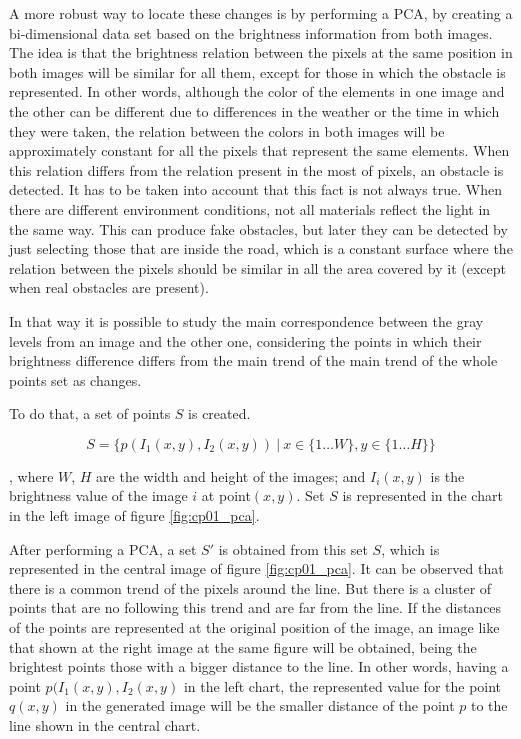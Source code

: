 A more robust way to locate these changes is by performing a \ac{PCA}, by creating a bi-dimensional data set based on the brightness information from both images. The idea is that the brightness relation between the pixels at the same position in both images will be similar for all them, except for those in which the obstacle is represented. In other words, although the color of the elements in one image and the other can be different due to differences in the weather or the time in which they were taken, the relation between the colors in both images will be approximately constant for all the pixels that represent the same elements. When this relation differs from the relation present in the most of pixels, an obstacle is detected. It has to be taken into account that this fact is not always true. When there are different environment conditions, not all materials reflect the light in the same way. This can produce fake obstacles, but later they can be detected by just selecting those that are inside the road, which is a constant surface where the relation between the pixels should be similar in all the area covered by it (except when real obstacles are present).

In that way it is possible to study the main correspondence between the gray levels from an image and the other one, considering the points in which their brightness difference differs from the main trend of the main trend of the whole points set as changes.

To do that, a set of points $S$ is created.

\begin{equation}\label{eq:cp01_brightness_relation}
S = \{ p(I_1(x, y), I_2(x,y)) ~|~ x \in \{1 \dots W\}, y \in \{1 \dots H\} \}
\end{equation}

, where $W$, $H$ are the width and height of the images; and $I_i(x, y)$ is the brightness value of the image $i$ at point$(x,y)$. Set $S$ is represented in the chart in the left image of figure \ref{fig:cp01_pca}.

After performing a PCA, a set $S'$ is obtained from this set $S$, which is represented in the central image of figure \ref{fig:cp01_pca}. It can be observed that there is a common trend of the pixels around the line. But there is a cluster of points that are no following this trend and are far from the line. If the distances of the points are represented at the original position of the image, an image like that shown at the right image at the same figure will be obtained, being the brightest points those with a bigger distance to the line. In other words, having a point $p(I_1(x, y), I_2(x, y)$ in the left chart, the represented value for the point $q(x, y)$ in the generated image will be the smaller distance of the point $p$ to the line shown in the central chart.

